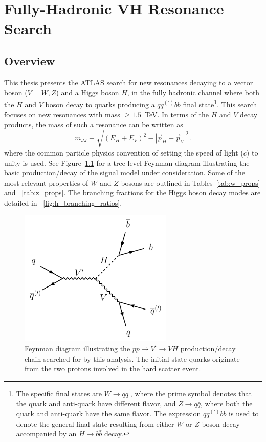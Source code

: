 \graphicspath{{Ch5_VHqqbb/figures/}}

\chapter{Fully-Hadronic VH Resonance Search}

\section{Overview}
\label{sec:overview_hvt}
This thesis presents the ATLAS search for new resonances decaying to a vector boson ($V = W,Z$) and a Higgs boson $H$, in the fully hadronic channel where both the $H$ and $V$ boson decay to quarks producing a $q\bar{q}^{(\prime)}b\bar{b}$ final state\footnote{The specific final states are $W \rightarrow q \bar{q}^\prime$, where the prime symbol denotes that the quark and anti-quark have different flavor, and $Z \rightarrow q\bar{q}$, where both the quark and anti-quark have the same flavor. The expression $q\bar{q}^{(\prime)}b\bar{b}$ is used to denote the general final state resulting from either $W$ or $Z$ boson decay accompanied by an $H \to b\bar{b}$ decay.}.
This search focuses on new resonances with mass $\geq 1.5$~TeV.
In terms of the $H$ and $V$ decay products, the mass of such a resonance can be written as
\begin{equation}
    m_{JJ} \equiv \sqrt{
        \left(E_H + E_V\right)^2
        -
        \left| \vec{p}_H + \vec{p}_V\right|^2
    }.
\end{equation}
where the common particle physics convention of setting the speed of light ($c$) to unity is used.
See Figure~\ref{fig:feynman_diagram_VHqqbb} for a tree-level Feynman diagram illustrating the basic production/decay of the signal model under consideration.
Some of the most relevant properties of $W$ and $Z$ bosons are outlined in Tables~\ref{tab:w_props} and ~\ref{tab:z_props}.
The branching fractions for the Higgs boson decay modes are detailed in ~\ref{fig:h_branching_ratios}.

\begin{figure}
	\centering
	\includegraphics[width=0.65\textwidth,origin=c]{VH____qqbb_Feynman_Diagram}
	\caption{
	Feynman diagram illustrating the $pp \rightarrow V^\prime \rightarrow VH$ production/decay chain searched for by this analysis.
	The initial state quarks originate from the two protons involved in the hard scatter event.
	}
	\label{fig:feynman_diagram_VHqqbb}
\end{figure}

